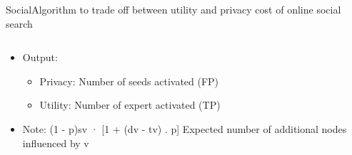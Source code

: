 \begin{frame}{Social}{Algorithm to trade off between utility and privacy cost of online social search \cite{li_algorithm_2016}}
\begin{columns}
\begin{column}{0.66\textwidth}
\begin{itemize}
\begin{itemize}
						\item Utility Privacy Cost Ratio Discount Algorithm:
							\begin{itemize}
								\item If (expert) \hspace{3mm} $d_{dv}$ = $(1 - p)^{sv}$ [1 + (dv - tv)] / (dv - sv)
								\item Else \hspace{9mm} $d_{dv}$ = $(1 - p)^{sv}$ \hspace{5mm} (dv - tv) / (dv - sv)
							\end{itemize}
							
					\end{itemize}
					
				\item Output:
					\begin{itemize}
						\item Privacy: Number of seeds activated (FP)
						\item Utility: Number of expert activated (TP)
					\end{itemize}
					
				\item Note: (1 - p)sv · [1 + (dv - tv) . p] Expected number of additional nodes influenced by v

			\end{itemize}
		\end{column}
	\end{columns}

\end{frame}

